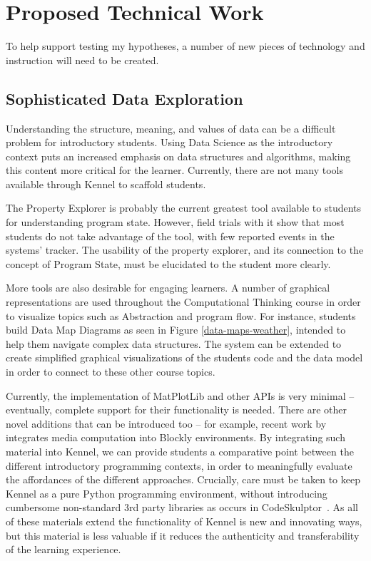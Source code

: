 \section{Proposed Technical Work}

To help support testing my hypotheses, a number of new pieces of technology and instruction will need to be created.

\subsection{Sophisticated Data Exploration}

Understanding the structure, meaning, and values of data can be a difficult problem for introductory students.
Using Data Science as the introductory context puts an increased emphasis on data structures and algorithms, making this content more critical for the learner.
Currently, there are not many tools available through Kennel to scaffold students.

The Property Explorer is probably the current greatest tool available to students for understanding program state.
However, field trials with it show that most students do not take advantage of the tool, with few reported events in the systems' tracker.
The usability of the property explorer, and its connection to the concept of Program State, must be elucidated to the student more clearly.

More tools are also desirable for engaging learners.
A number of graphical representations are used throughout the Computational Thinking course in order to visualize topics such as Abstraction and program flow.
For instance, students build Data Map Diagrams as seen in Figure \ref{data-maps-weather}, intended to help them navigate complex data structures.
The system can be extended to create simplified graphical visualizations of the students code and the data model in order to connect to these other course topics.

Currently, the implementation of MatPlotLib and other APIs is very minimal -- eventually, complete support for their functionality is needed.
There are other novel additions that can be introduced too -- for example, recent work by \cite{pixly} integrates media computation into Blockly environments.
By integrating such material into Kennel, we can provide students a comparative point between the different introductory programming contexts, in order to meaningfully evaluate the affordances of the different approaches.
Crucially, care must be taken to keep Kennel as a pure Python programming environment, without introducing cumbersome non-standard 3rd party libraries as occurs in CodeSkulptor~\cite{code-skulptor}.
As all of these materials extend the functionality of Kennel is new and innovating ways, but this material is less valuable if it reduces the authenticity and transferability of the learning experience.

